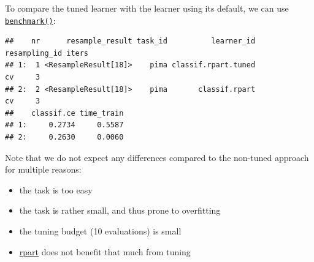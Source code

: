 \documentclass[]{scrbook}
\newenvironment{Shaded}{\begin{snugshade}}{\end{snugshade}}
\newcommand{\CommentTok}[1]{\textcolor[rgb]{0.56,0.35,0.01}{\textit{#1}}}
\newcommand{\DataTypeTok}[1]{\textcolor[rgb]{0.13,0.29,0.53}{#1}}
\newcommand{\DecValTok}[1]{\textcolor[rgb]{0.00,0.00,0.81}{#1}}
\newcommand{\KeywordTok}[1]{\textcolor[rgb]{0.13,0.29,0.53}{\textbf{#1}}}
\newcommand{\NormalTok}[1]{#1}
\newcommand{\OperatorTok}[1]{\textcolor[rgb]{0.81,0.36,0.00}{\textbf{#1}}}
\newcommand{\StringTok}[1]{\textcolor[rgb]{0.31,0.60,0.02}{#1}}
\providecommand{\tightlist}{%
  \setlength{\itemsep}{0pt}\setlength{\parskip}{0pt}}
\renewenvironment{Shaded} {\begin{snugshade}\small} {\end{snugshade}}
\begin{document}
To compare the tuned learner with the learner using its default, we can use \href{https://mlr3.mlr-org.com/reference/benchmark.html}{\texttt{benchmark()}}:

\begin{Shaded}
\end{Shaded}

\begin{verbatim}
##    nr      resample_result task_id          learner_id resampling_id iters
## 1:  1 <ResampleResult[18]>    pima classif.rpart.tuned            cv     3
## 2:  2 <ResampleResult[18]>    pima       classif.rpart            cv     3
##    classif.ce time_train
## 1:     0.2734     0.5587
## 2:     0.2630     0.0060
\end{verbatim}

Note that we do not expect any differences compared to the non-tuned approach for multiple reasons:

\begin{itemize}
\tightlist
\item
  the task is too easy
\item
  the task is rather small, and thus prone to overfitting
\item
  the tuning budget (10 evaluations) is small
\item
  \href{https://cran.r-project.org/package=rpart}{rpart} does not benefit that much from tuning
\end{itemize}
\end{document}
